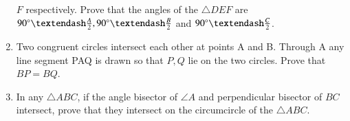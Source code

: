 \begin{enumerate}[label=\arabic*.,ref=\thesubsection.\theenumi]
$F$ respectively. Prove that the angles of the $\triangle DEF$ are $90\degree – \frac{A}{2}, 90\degree – \frac{B}{2}$ and $90\degree – \frac{C}{2}$.
\item Two congruent circles intersect each other at points A and B. Through A any line segment PAQ is drawn so that $P, Q$ lie on the two circles. Prove that $BP = BQ$.
\item In any $\triangle ABC$, if the angle bisector of $\angle A$ and perpendicular bisector of $BC$ intersect, prove that they intersect on the circumcircle of the $\triangle ABC$.
\end{enumerate}

